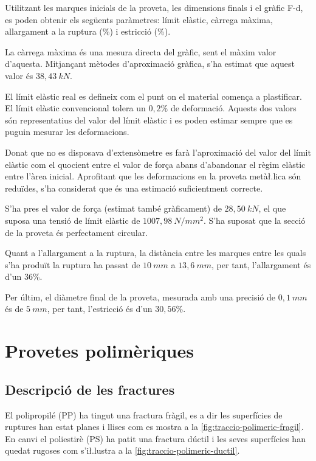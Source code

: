 \documentclass[a4paper]{report}
\begin{document}
Utilitzant les marques inicials de la proveta, les dimensions finals i el gràfic F-d, es poden obtenir els següents paràmetres: límit elàstic, càrrega màxima, allargament a la ruptura (\%) i estricció (\%).

La càrrega màxima és una mesura directa del gràfic, sent el màxim valor d'aquesta. Mitjançant mètodes d'aproximació gràfica, s'ha estimat que aquest valor és $38,43 \ kN$.

El límit elàstic real es defineix com el punt on el material comença a plastificar. El límit elàstic convencional tolera un $0,2\%$ de deformació. Aquests dos valors són representatius del valor del límit elàstic i es poden estimar sempre que es puguin mesurar les deformacions. 

Donat que no es disposava d'extensòmetre es farà l'aproximació del valor del límit elàstic com el quocient entre el valor de força abans d'abandonar el règim elàstic entre l'àrea inicial. Aprofitant que les deformacions en la proveta metà\l.lica són reduïdes, s'ha considerat que és una estimació suficientment correcte.

S'ha pres el valor de força (estimat també gràficament) de $28,50 \ kN$, el que suposa una tensió de límit elàstic de $1007,98 \ N/mm^2$. S'ha suposat que la secció de la proveta és perfectament circular.

Quant a l'allargament a la ruptura, la distància entre les marques entre les quals s'ha produït la ruptura ha passat de $10 \ mm$ a $13,6 \ mm$, per tant, l'allargament és d'un $36\%$.

Per últim, el diàmetre final de la proveta, mesurada amb una precisió de $0,1 \ mm$ és de $5 \ mm$, per tant, l'estricció és d'un $30,56\%$.

\section{Provetes polimèriques}
\subsection{Descripció de les fractures}
El polipropilé (PP) ha tingut una fractura fràgil, es a dir les superfícies de ruptures han estat planes i llises com es mostra a la \autoref{fig:traccio-polimeric-fragil}. En canvi el poliestirè (PS) ha patit una fractura dúctil i les seves superfícies han quedat rugoses com s'i\l.lustra a la \autoref{fig:traccio-polimeric-ductil}.
\end{document}

